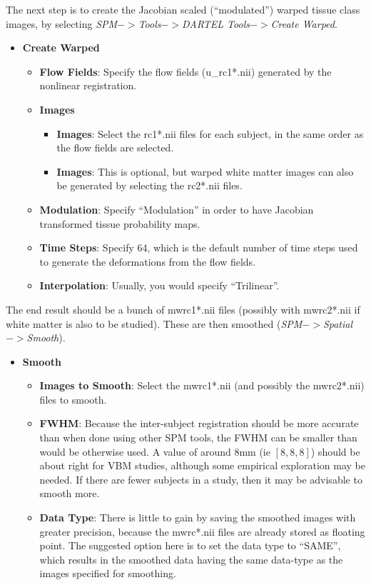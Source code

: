 The next step is to create the Jacobian scaled (``modulated'') warped tissue class images, by selecting \emph{SPM$->$Tools$->$DARTEL Tools$->$Create Warped}.
\begin{itemize}
\item{{\bf Create Warped}
  \begin{itemize}
  \item{{\bf Flow Fields}: Specify the flow fields (u\_rc1*.nii) generated by the nonlinear registration.
  }
  \item{{\bf Images}
    \begin{itemize}
    \item{{\bf Images}: Select the rc1*.nii files for each subject, in the same order as the flow fields are selected.
    }
    \item{{\bf Images}: This is optional, but warped white matter images can also be generated by selecting the rc2*.nii files.
    }
    \end{itemize}
  }
  \item{{\bf Modulation}: Specify ``Modulation'' in order to have Jacobian transformed tissue probability maps.
  }
  \item{{\bf Time Steps}: Specify 64, which is the default number of time steps used to generate the deformations from the flow fields.
  }
  \item{{\bf Interpolation}: Usually, you would specify ``Trilinear''.
  }
  \end{itemize}
}
\end{itemize}

The end result should be a bunch of mwrc1*.nii files (possibly with mwrc2*.nii if white matter is also to be studied). These are then smoothed (\emph{SPM$->$Spatial$->$Smooth}).
\begin{itemize}
\item{{\bf Smooth}
  \begin{itemize}
  \item{{\bf Images to Smooth}: Select the mwrc1*.nii (and possibly the mwrc2*.nii) files to smooth.
  }
  \item{{\bf FWHM}: Because the inter-subject registration should be more accurate than when done using other SPM tools, the FWHM can be smaller than would be otherwise used.  A value of around 8mm (ie $[8, 8, 8]$) should be about right for VBM studies, although some empirical exploration may be needed.  If there are fewer subjects in a study, then it may be advisable to smooth more.
  }
  \item{{\bf Data Type}: There is little to gain by saving the smoothed images with greater precision, because the mwrc*.nii files are already stored as floating point. The suggested option here is to set the data type to ``SAME'', which results in the smoothed data having the same data-type as the images specified for smoothing.
  }
  \end{itemize}
}
\end{itemize}

